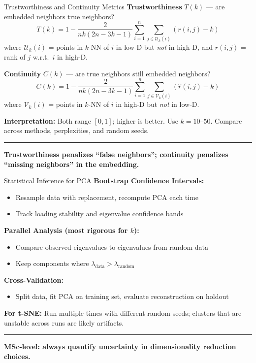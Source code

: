 \documentclass[8pt,aspectratio=169]{beamer}
\newcommand{\bottomnote}[1]{%
\vfill
\vspace{-2mm}
\textcolor{mllavender2}{\rule{\textwidth}{0.4pt}}
\vspace{1mm}
\footnotesize
\textbf{#1}
}
\begin{document}
\begin{frame}[t]{Trustworthiness and Continuity Metrics}
\textbf{Trustworthiness} $T(k)$ --- are embedded neighbors true neighbors?
\[
T(k) = 1 - \frac{2}{nk(2n-3k-1)} \sum_{i=1}^{n} \sum_{j \in \mathcal{U}_k(i)} (r(i,j) - k)
\]
where $\mathcal{U}_k(i)$ = points in $k$-NN of $i$ in low-D but \textit{not} in high-D, and $r(i,j)$ = rank of $j$ w.r.t.\ $i$ in high-D.

\vspace{0.3em}
\textbf{Continuity} $C(k)$ --- are true neighbors still embedded neighbors?
\[
C(k) = 1 - \frac{2}{nk(2n-3k-1)} \sum_{i=1}^{n} \sum_{j \in \mathcal{V}_k(i)} (\hat{r}(i,j) - k)
\]
where $\mathcal{V}_k(i)$ = points in $k$-NN of $i$ in high-D but \textit{not} in low-D.

\vspace{0.3em}
\textbf{Interpretation:} Both range $[0, 1]$; higher is better. Use $k = 10\text{--}50$. Compare across methods, perplexities, and random seeds.
\bottomnote{Trustworthiness penalizes ``false neighbors''; continuity penalizes ``missing neighbors'' in the embedding.}
\end{frame}

\begin{frame}[t]{Statistical Inference for PCA}
\textbf{Bootstrap Confidence Intervals:}
\begin{itemize}
  \item Resample data with replacement, recompute PCA each time
  \item Track loading stability and eigenvalue confidence bands
\end{itemize}

\textbf{Parallel Analysis (most rigorous for $k$):}
\begin{itemize}
  \item Compare observed eigenvalues to eigenvalues from random data
  \item Keep components where $\lambda_{\text{data}} > \lambda_{\text{random}}$
\end{itemize}

\textbf{Cross-Validation:}
\begin{itemize}
  \item Split data, fit PCA on training set, evaluate reconstruction on holdout
\end{itemize}

\textbf{For t-SNE:} Run multiple times with different random seeds; clusters that are unstable across runs are likely artifacts.
\bottomnote{MSc-level: always quantify uncertainty in dimensionality reduction choices.}
\end{frame}
\end{document}
